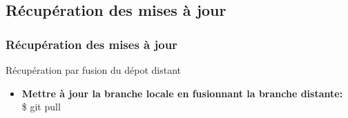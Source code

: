 \documentclass{beamer}
\begin{document}

\subsection{R\'{e}cup\'{e}ration des mises \`{a} jour}
\begin{frame}
\frametitle{R\'{e}cup\'{e}ration des mises \`{a} jour}
\begin{block}{R\'{e}cup\'{e}ration par fusion du d\'{e}pot distant}
\begin{itemize}
\item \textbf{Mettre \`{a} jour la branche locale en fusionnant la branche distante:} \\
\$ git pull
\end{itemize}
\end{block}
\end{frame}





\end{document}

